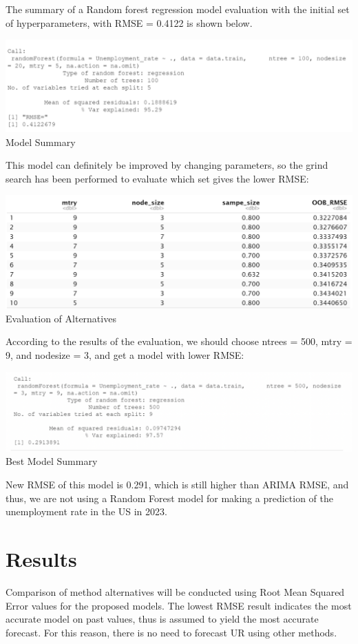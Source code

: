 \documentclass{article}
\begin{document}
	The summary of a Random forest regression model evaluation with the initial set of hyperparameters, with RMSE = 0.4122 is shown below.
	\begin{center}
		\includegraphics[width=1\textwidth]{assets/rf.png}
		{Model Summary}
	\end{center}
	This model can definitely be improved by changing parameters, so the grind search has been performed to evaluate which set gives the lower RMSE:
	\begin{center}
		\includegraphics[width=1\textwidth]{assets/rfTable.png}
		{Evaluation of Alternatives}
	\end{center}
	According to the results of the evaluation, we should choose ntrees = 500, mtry = 9,  and nodesize = 3, and get a model with lower RMSE:
	\begin{center}
		\includegraphics[width=1\textwidth]{assets/bestRf.png}
		{Best Model Summary}
	\end{center}
	New RMSE of this model is 0.291, which is still higher than ARIMA RMSE, and thus, we are not using a Random Forest model for making a prediction of the unemployment rate in the US in 2023.


\section{Results}
Comparison of method alternatives will be conducted using Root Mean Squared Error values for the proposed models. The lowest RMSE result indicates the most accurate model on past values, thus is assumed to yield the most accurate forecast. For this reason, there is no need to forecast UR using other methods.
\end{document}
